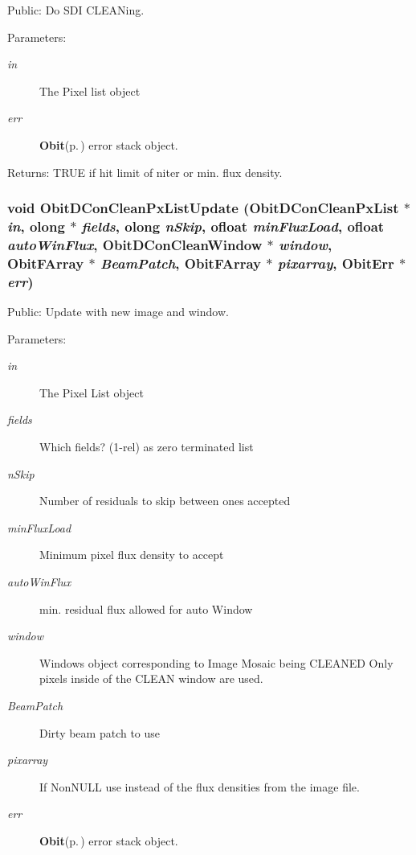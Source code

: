 Public: Do SDI CLEANing. 

\begin{Desc}
\item[Parameters:]
\begin{description}
\item[{\em in}]The Pixel list object \item[{\em err}]{\bf Obit}{\rm (p.\,\pageref{structObit})} error stack object. \end{description}
\end{Desc}
\begin{Desc}
\item[Returns:]TRUE if hit limit of niter or min. flux density. \end{Desc}
\subsubsection{\setlength{\rightskip}{0pt plus 5cm}void Obit\-DCon\-Clean\-Px\-List\-Update ({\bf Obit\-DCon\-Clean\-Px\-List} $\ast$ {\em in}, {\bf olong} $\ast$ {\em fields}, {\bf olong} {\em n\-Skip}, {\bf ofloat} {\em min\-Flux\-Load}, {\bf ofloat} {\em auto\-Win\-Flux}, {\bf Obit\-DCon\-Clean\-Window} $\ast$ {\em window}, {\bf Obit\-FArray} $\ast$ {\em Beam\-Patch}, {\bf Obit\-FArray} $\ast$ {\em pixarray}, {\bf Obit\-Err} $\ast$ {\em err})}\label{ObitDConCleanPxList_8c_a18}


Public: Update with new image and window. 

\begin{Desc}
\item[Parameters:]
\begin{description}
\item[{\em in}]The Pixel List object \item[{\em fields}]Which fields? (1-rel) as zero terminated list \item[{\em n\-Skip}]Number of residuals to skip between ones accepted \item[{\em min\-Flux\-Load}]Minimum pixel flux density to accept \item[{\em auto\-Win\-Flux}]min. residual flux allowed for auto Window \item[{\em window}]Windows object corresponding to Image Mosaic being CLEANED Only pixels inside of the CLEAN window are used. \item[{\em Beam\-Patch}]Dirty beam patch to use \item[{\em pixarray}]If Non\-NULL use instead of the flux densities from the image file. \item[{\em err}]{\bf Obit}{\rm (p.\,\pageref{structObit})} error stack object. \end{description}
\end{Desc}
